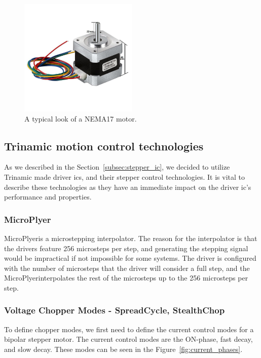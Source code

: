 \begin{figure}[H]
    \centering
    \includegraphics[width=0.5\textwidth]{obrazky/nema17}
    \caption{A typical look of a NEMA17 motor.}
    \label{fig:nema17}
\end{figure}

\subsection{Trinamic motion control technologies}
\label{subsec:trinamic_tech}
As we described in the Section~\ref{subsec:stepper_ic}, we decided to utilize Trinamic made driver \acs{ic}s, and their stepper control technologies.
It is vital to describe these technologies as they have an immediate impact on the driver \acs{ic}'s performance and properties.

\subsubsection{MicroPlyer\texttrademark}
MicroPlyer\texttrademark is a microstepping interpolator.
The reason for the interpolator is that the drivers feature 256 microsteps per step, and generating the stepping signal would be impractical if not impossible for some systems.
The driver is configured with the number of microsteps that the driver will consider a full step, and the MicroPlyer\texttrademark interpolates the rest of the microsteps up to the 256 microsteps per step\cite{trinamic_microstepping_nodate}.

\subsubsection{Voltage Chopper Modes - SpreadCycle\texttrademark, StealthChop\texttrademark}
To define chopper modes, we first need to define the current control modes for a bipolar stepper motor.
The current control modes are the ON-phase, fast decay, and slow decay.
These modes can be seen in the Figure~\ref{fig:current_phases}.

